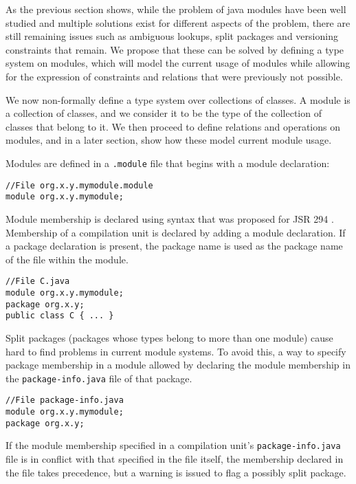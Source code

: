 
As the previous section shows, while the problem of java modules have been
well studied and multiple solutions exist for different aspects of the problem,
there are still remaining issues such as ambiguous lookups, split packages and
versioning constraints that remain. We propose that these can be solved by
defining a type system on modules, which will model the current usage
of modules while allowing for the expression of constraints and relations
that were previously not possible.

We now non-formally define a type system over collections of classes. 
A module is a collection of classes, and we consider it to be the type of 
the collection of classes that belong to it. We then proceed to define
relations and operations on modules, and in a later section, show how
these model current module usage.


Modules are defined in a {\tt .module} file that begins with a module
declaration:

\begin{lstlisting}
//File org.x.y.mymodule.module
module org.x.y.mymodule;
\end{lstlisting}

Module membership is declared using syntax that was proposed 
for JSR 294 \cite{superpackageChange}. Membership of a compilation unit is 
declared by adding a module declaration. If a package declaration is present, 
the package name is used as the package name of the file within the module.

\begin{lstlisting}
//File C.java
module org.x.y.mymodule;
package org.x.y;
public class C { ... }
\end{lstlisting}

Split packages (packages whose types belong to more than one module) cause hard to 
find problems in current module systems\cite{iJAMComments}. To avoid this, 
a way to specify package membership in a module allowed by declaring the module membership
in the {\tt package-info.java} file of that package.

\begin{lstlisting}
//File package-info.java
module org.x.y.mymodule;
package org.x.y;
\end{lstlisting}

If the module membership specified in a compilation unit's {\tt package-info.java}
file is in conflict with that specified in the file itself, the membership
declared in the file takes precedence, but a warning is issued to flag a possibly
split package.

